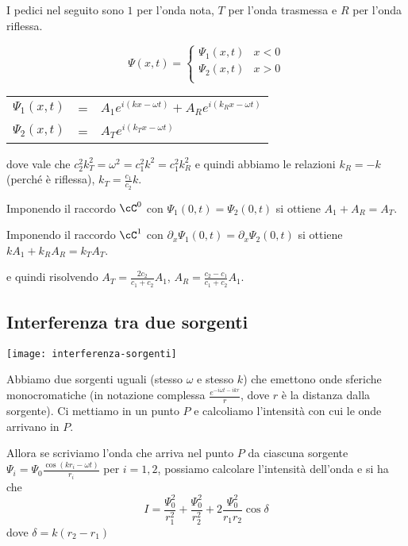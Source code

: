 \documentclass[10pt,a4paper]{article}
\begin{document}
\begin{multicols}{2}
\begin{paragrafo}
    I pedici nel seguito sono $1$ per l'onda nota, $T$ per l'onda trasmessa e $R$ per l'onda riflessa.
  \end{paragrafo}
  
  $$ \Psi(x, t) = \left\{
    \begin{array}{lr}
      \Psi_1(x, t) & x < 0 \\
      \Psi_2(x, t) & x > 0 \\
    \end{array}
  \right. $$

  \begin{tabular}{lcl}
    $\Psi_1(x, t)$ & = & $A_1 e^{i(kx - \omega t)} + A_R e^{i(k_R x - \omega t)}$ \\
    $\Psi_2(x, t)$ & = & $A_T e^{i(k_T x - \omega t)}$                            \\
  \end{tabular}

  dove vale che $c_2^2 k_T^2 = \omega^2 = c_1^2 k^2 = c_1^2 k_R^2$ e quindi abbiamo le relazioni $k_R = - k$ (perché è riflessa), $k_T = \frac{c_1}{c_2} k$.

  Imponendo il raccordo $\cC^0$ con $\Psi_1(0, t) = \Psi_2(0, t)$ si ottiene $A_1 + A_R = A_T$.
  
  Imponendo il raccordo $\cC^1$ con $\partial_x \Psi_1(0, t) = \partial_x \Psi_2(0, t)$ si ottiene $k A_1 + k_R A_R = k_T A_T$.

  e quindi risolvendo $A_T = \frac{2 c_2}{c_1 + c_2} A_1$, $A_R = \frac{c_2 - c_1}{c_1 + c_2} A_1$.                      

  \subsection*{Interferenza tra due sorgenti}
  \begin{center}
    \texttt{[image: interferenza-sorgenti]}
  \end{center}

  \begin{paragrafo}
    Abbiamo due sorgenti uguali (stesso $\omega$ e stesso $k$) che emettono onde sferiche monocromatiche (in notazione complessa $\frac{e^{-i\omega t - ikr}}{r}$, dove $r$ è la distanza dalla sorgente). Ci mettiamo in un punto $P$ e calcoliamo l'intensità con cui le onde arrivano in $P$.
  \end{paragrafo}

  Allora se scriviamo l'onda che arriva nel punto $P$ da ciascuna sorgente $\Psi_i = \Psi_0 \frac{\cos(k r_i - \omega t)}{r_i}$ per $i = 1, 2$, possiamo calcolare l'intensità dell'onda e si ha che
  $$ I = \frac{\Psi_0^2}{r_1^2} + \frac{\Psi_0^2}{r_2^2} + 2 \frac{\Psi_0^2}{r_1 r_2} \cos \delta $$
  dove $\delta = k (r_2 - r_1)$


\end{multicols}
\end{document}
